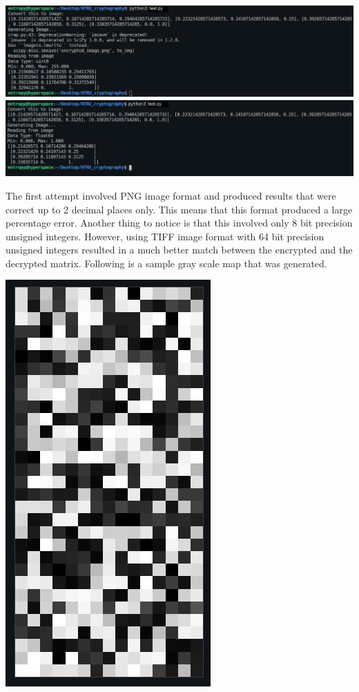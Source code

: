 \documentclass[cryptography,article,submit,moreauthors,pdftex]{Definitions/mdpi}
\begin{document}
\begin{center}
		\includegraphics[scale=0.53]{images/Attempt 1.jpg}
		\includegraphics[scale=0.53]{images/Attempt 2.jpg}
\end{center}

\begin{flushleft}
The first attempt involved PNG image format and produced results that were correct up to 2 decimal places only. This means that this format produced a large percentage error. Another thing to notice is that this involved only 8 bit precision unsigned integers. However, using TIFF image format with 64 bit precision unsigned integers resulted in a much better match between the encrypted and the decrypted matrix. Following is a sample gray scale map that was generated.
\end{flushleft}

\begin{center}
	\includegraphics[scale=0.59]{images/grayscale map.jpg}
\end{center}
\end{document}
